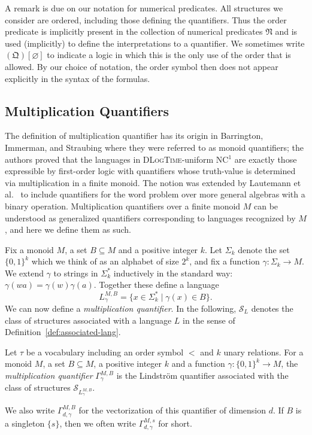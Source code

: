 \documentclass[a4paper,UKenglish,cleveref, autoref, thm-restate, anonymous]{lipics-v2021}
\begin{document}
A remark is due on our notation for numerical predicates.  All structures we consider are ordered, including those defining the quantifiers.  Thus the order predicate is implicitly present in the collection of numerical predicates $\mathfrak{N}$ and is used (implicitly) to define the interpretations to a quantifier.  We sometimes write $(\mathfrak{Q})[\varnothing]$ to indicate a logic in which this is the only use of the order that is allowed.  By our choice of notation, the order symbol then does not appear explicitly in the syntax of the formulas.

\subsection{Multiplication Quantifiers}

The definition of multiplication quantifier has its origin in Barrington, Immerman, and Straubing \cite[Section 5]{barrington1990uniformity} where they were referred to as monoid quantifiers; the authors proved that the languages in \textsc{DLogTime}-uniform NC${}^1$ are exactly those expressible by first-order logic with quantifiers whose truth-value is determined via multiplication in a finite monoid.  The notion was extended by Lautemann et al.~\cite{lautemann2001descriptive} to include quantifiers for the word problem over more general algebras with a binary operation.  Multiplication quantifiers over a finite monoid $M$ can be understood as generalized quantifiers corresponding to languages recognized by $M$, and here we define them as such.

Fix a monoid $M$, a set $B \subseteq M$ and a positive integer $k$.  Let $\Sigma_k$ denote the set $\{0,1\}^k$ which we think of as an alphabet of size $2^k$, and fix a function $\gamma: \Sigma_k \rightarrow M$.  We extend $\gamma$ to strings in $\Sigma_k^*$ inductively in the standard way: $\gamma(wa) = \gamma(w)\gamma(a)$.  Together these define a language
$$L^{M,B}_{\gamma} = \{ x \in \Sigma_k^* \mid \gamma(x) \in B\}.$$
We can now define a \emph{multiplication quantifier}.  In the following, $\mathcal{S}_L$ denotes the class of structures associated with a language $L$ in the sense of Definition~\ref{def:associated-lang}.
\begin{definition}\label{def:multquant}
Let $\tau$ be a vocabulary including an order symbol $<$ and $k$ unary relations.
For a monoid $M$, a set $B \subseteq M$, a positive integer $k$ and a function $\gamma: \{0,1\}^k \rightarrow M$, the \emph{multiplication quantifier} $\Gamma_{\gamma}^{M,B}$ is the Lindstr\"om quantifier associated with the class of structures $\mathcal{S}_{L^{M,B}_{\gamma}}$.

We also write $\Gamma_{d,\gamma}^{M,B}$ for the vectorization of this quantifier of dimension $d$. If $B$ is a singleton $\{s\}$, then we often write $\Gamma^{M,s}_{d,\gamma}$ for short.
\end{definition}
\end{document}
